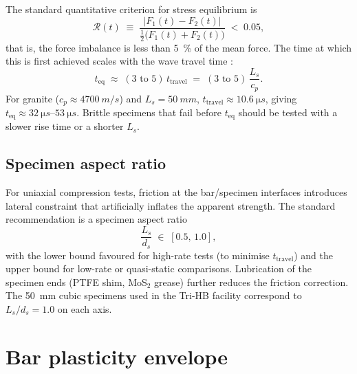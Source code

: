 \documentclass[11pt,a4paper,openany]{book}
\providecommand{\SI}[2]{\qty{#1}{#2}}
\providecommand{\SIrange}[3]{\qtyrange{#1}{#2}{#3}}
\theoremstyle{handbook}
\newcommand{\Ls}{L_s}
\begin{document}
The standard quantitative criterion for stress equilibrium
\cite{RaviChandar2002,Zhou2010} is
\begin{equation}
  \mathcal{R}(t) \;\equiv\; \frac{|F_1(t)-F_2(t)|}{\tfrac{1}{2}\bigl(F_1(t)+F_2(t)\bigr)} \;<\; 0.05,
  \label{eq:equilibrium}
\end{equation}
that is, the force imbalance is less than \SI{5}{\percent} of the mean
force. The time at which this is first achieved scales with the wave
travel time \cite{DaviesHunter1963}:
\begin{equation}
  t_{\text{eq}} \;\approx\; (3\text{ to }5)\,t_{\text{travel}}
  \;=\; (3\text{ to }5)\,\frac{\Ls}{c_p}.
  \label{eq:t-eq}
\end{equation}
For granite ($c_p \approx \SI{4700}{m/s}$) and $\Ls = \SI{50}{mm}$,
$t_{\text{travel}} \approx \SI{10.6}{\micro s}$, giving
$t_{\text{eq}} \approx \SIrange{32}{53}{\micro s}$. Brittle specimens that
fail before $t_{\text{eq}}$ should be tested with a slower rise time or a
shorter $\Ls$.

\subsection{Specimen aspect ratio}\label{sec:aspect-ratio}

For uniaxial compression tests, friction at the bar/specimen interfaces
introduces lateral constraint that artificially inflates the apparent
strength. The standard recommendation \cite{DaviesHunter1963,ChenSong2011}
is a specimen aspect ratio
\begin{equation}
  \frac{\Ls}{d_s} \;\in\; [0.5,\,1.0],
\end{equation}
with the lower bound favoured for high-rate tests (to minimise
$t_{\text{travel}}$) and the upper bound for low-rate or quasi-static
comparisons. Lubrication of the specimen ends (PTFE shim, MoS$_2$ grease)
further reduces the friction correction. The \SI{50}{mm} cubic specimens
used in the Tri-HB facility correspond to $\Ls/d_s = 1.0$ on each axis.

\section{Bar plasticity envelope}\label{sec:bar-plasticity}
\end{document}
